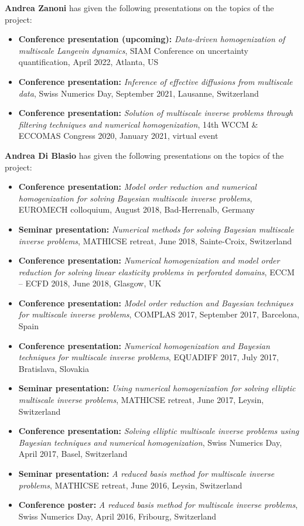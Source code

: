 \documentclass[10pt]{article}
\begin{document}
%
\textbf{Andrea Zanoni} has given the following presentations on the topics of the project:
\begin{itemize}
	\item \textbf{Conference presentation (upcoming):} \textit{Data-driven homogenization of multiscale Langevin dynamics}, SIAM Conference on uncertainty quantification, April 2022, Atlanta, US
	\item \textbf{Conference presentation:} \textit{Inference of effective diffusions from multiscale data}, Swiss Numerics Day, September 2021, Lausanne, Switzerland
	\item \textbf{Conference presentation:} \textit{Solution of multiscale inverse problems through filtering techniques and numerical homogenization}, 14th WCCM \& ECCOMAS Congress 2020, January 2021, virtual event
\end{itemize}
%
\textbf{Andrea Di Blasio} has given the following presentations on the topics of the project:
\begin{itemize}
	\item \textbf{Conference presentation:} \textit{Model order reduction and numerical homogenization for solving Bayesian multiscale inverse problems}, EUROMECH colloquium, August 2018, Bad-Herrenalb, Germany
	\item \textbf{Seminar presentation:} \textit{Numerical methods for solving Bayesian multiscale inverse problems}, MATHICSE retreat, June 2018, Sainte-Croix, Switzerland
	\item \textbf{Conference presentation:} \textit{Numerical homogenization and model order reduction for solving linear elasticity problems in perforated domains}, ECCM -- ECFD 2018, June 2018, Glasgow, UK
	\item \textbf{Conference presentation:} \textit{Model order reduction and Bayesian techniques for multiscale inverse problems}, COMPLAS 2017, September 2017, Barcelona, Spain
	\item \textbf{Conference presentation:} \textit{Numerical homogenization and Bayesian techniques for multiscale inverse problems}, EQUADIFF 2017, July 2017, Bratislava, Slovakia
	\item \textbf{Seminar presentation:} \textit{Using numerical homogenization for solving elliptic multiscale inverse problems}, MATHICSE retreat, June 2017, Leysin, Switzerland
	\item \textbf{Conference presentation:} \textit{Solving elliptic multiscale inverse problems using Bayesian techniques and numerical homogenization}, Swiss Numerics Day, April 2017, Basel, Switzerland
	\item \textbf{Seminar presentation:} \textit{A reduced basis method for multiscale inverse problems}, MATHICSE retreat, June 2016, Leysin, Switzerland
	\item \textbf{Conference poster:} \textit{A reduced basis method for multiscale inverse problems}, Swiss Numerics Day, April 2016, Fribourg, Switzerland
\end{itemize}
\end{document}
